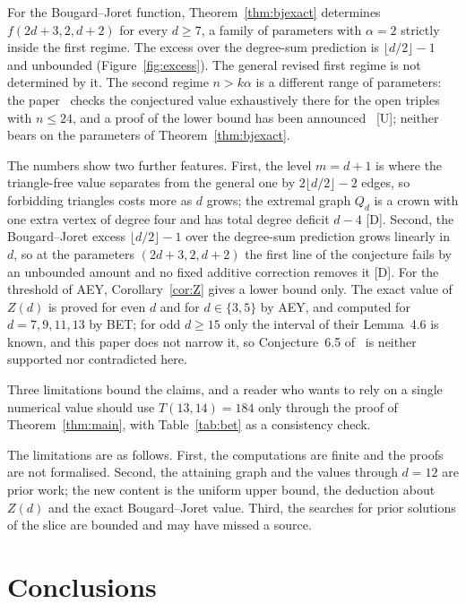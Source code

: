 \documentclass[11pt]{article}
\theoremstyle{remark}
\begin{document}
For the Bougard--Joret function, Theorem~\ref{thm:bjexact} determines $f(2d+3,2,d+2)$ for every $d\ge7$, a family of parameters with $\alpha=2$ strictly inside the first regime. The excess over the degree-sum prediction is $\lfloor d/2\rfloor-1$ and unbounded (Figure~\ref{fig:excess}). The general revised first regime is not determined by it. The second regime $n>k\alpha$ is a different range of parameters: the paper~\cite{SR} checks the conjectured value exhaustively there for the open triples with $n\le24$, and a proof of the lower bound has been announced~\cite{Didin} [U]; neither bears on the parameters of Theorem~\ref{thm:bjexact}.

The numbers show two further features. First, the level $m=d+1$ is where the triangle-free value separates from the general one by $2\lfloor d/2\rfloor-2$ edges, so forbidding triangles costs more as $d$ grows; the extremal graph $Q_d$ is a crown with one extra vertex of degree four and has total degree deficit $d-4$ [D]. Second, the Bougard--Joret excess $\lfloor d/2\rfloor-1$ over the degree-sum prediction grows linearly in $d$, so at the parameters $(2d+3,2,d+2)$ the first line of the conjecture fails by an unbounded amount and no fixed additive correction removes it [D]. For the threshold of AEY, Corollary~\ref{cor:Z} gives a lower bound only. The exact value of $Z(d)$ is proved for even $d$ and for $d\in\{3,5\}$ by AEY, and computed for $d=7,9,11,13$ by BET; for odd $d\ge15$ only the interval of their Lemma~4.6 is known, and this paper does not narrow it, so Conjecture~6.5 of~\cite{AEY} is neither supported nor contradicted here.

Three limitations bound the claims, and a reader who wants to rely on a single numerical value should use $T(13,14)=184$ only through the proof of Theorem~\ref{thm:main}, with Table~\ref{tab:bet} as a consistency check.

The limitations are as follows. First, the computations are finite and the proofs are not formalised. Second, the attaining graph and the values through $d=12$ are prior work; the new content is the uniform upper bound, the deduction about $Z(d)$ and the exact Bougard--Joret value. Third, the searches for prior solutions of the slice are bounded and may have missed a source.

\section{Conclusions}\label{sec:concl}
\end{document}
